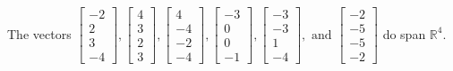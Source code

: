 \begin{exercise}
\begin{exerciseStatement}
  \end{exerciseStatement}
  \begin{exerciseAnswer}
   The vectors \(\left[\begin{array}{r}
-2 \\
2 \\
3 \\
-4
\end{array}\right] , \left[\begin{array}{r}
4 \\
3 \\
2 \\
3
\end{array}\right] , \left[\begin{array}{r}
4 \\
-4 \\
-2 \\
-4
\end{array}\right] , \left[\begin{array}{r}
-3 \\
0 \\
0 \\
-1
\end{array}\right] , \left[\begin{array}{r}
-3 \\
-3 \\
1 \\
-4
\end{array}\right] , \text{ and } \left[\begin{array}{r}
-2 \\
-5 \\
-5 \\
-2
\end{array}\right]\) 
  	 do  
	span \(\mathbb{R}^4\).
  


  \end{exerciseAnswer}
\end{exercise}